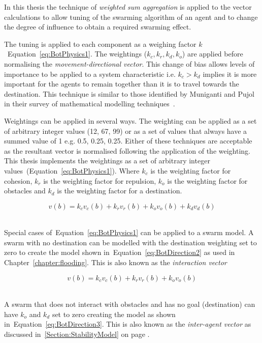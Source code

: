 In this thesis the technique of \textit{weighted sum aggregation} is applied to the vector calculations to allow tuning of the swarming algorithm of an agent and to change the degree of influence to obtain a required swarming effect. 

The tuning is applied to each component as a weighing factor $k$~Equation~\ref{eq:BotPhysics1}. The weightings ($k_c, k_r, k_d, k_o$) are applied before normalising the \textit{movement-directional vector}. This change of bias allows levels of importance to be applied to a system characteristic i.e. $k_c > k_d$ implies it is more important for the agents to remain together than it is to travel towards the destination. This technique is similar to those identified by Muniganti and Pujol in their survey of mathematical modelling techniques~\cite{MP:10}. 

Weightings can be applied in several ways. The weighting can be applied as a set of arbitrary integer values (12, 67, 99) or as a set of values that always have a summed value of 1 e.g. 0.5, 0.25, 0.25. Either of these techniques are acceptable as the resultant vector is normalised following the application of the weighting. This thesis implements the weightings as a set of arbitrary integer values~(Equation~\ref{eq:BotPhysics1}). Where $k_c$ is the weighting factor for cohesion, $k_r$ is the weighting factor for repulsion, $k_o$ is the weighting factor for obstacles and $k_d$ is the weighting factor for a destination. 

\begin{equation}\label{eq:BotPhysics1}‎
v(b) =‎ k_cv_c(b) + k_rv_r(b) + k_ov_o(b) + k_dv_d(b)
\end{equation}‎

Special cases of~Equation~\ref{eq:BotPhysics1} can be applied to a swarm model. A swarm with no destination can be modelled with the destination weighting set to zero to create the model shown in~Equation~\ref{eq:BotDirection2} as used in Chapter~\ref{chapter:flooding}. This is also known as the \textit{interaction vector}

\begin{center}
\begin{equation}
\label{eq:BotDirection2}
v(b) =‎ k_cv_c(b) + k_rv_r(b) + k_ov_o(b)
\end{equation}‎
\end{center}

A swarm that does not interact with obstacles and has no goal (destination) can have $k_o$ and $k_d$ set to zero creating the model as shown in~Equation~\ref{eq:BotDirection3}. This is also known as the \textit{inter-agent vector} as discussed in~\ref{Section:StabilityModel} on page \pageref{Section:StabilityModel}.


